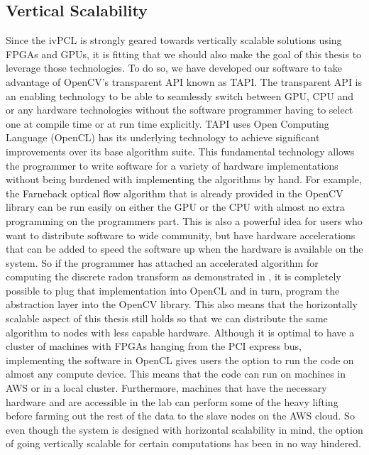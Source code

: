 \subsection{\label{subsection:opencv_tapi}Vertical Scalability}
Since the ivPCL is strongly geared towards vertically scalable solutions using
FPGAs and GPUs, it is fitting that we should also make the goal of this thesis
to leverage those technologies. To do so, we have developed our software to take
advantage of OpenCV's transparent API known as TAPI. The transparent API is an
enabling technology to be able to seamlessly switch between GPU, CPU and or any
hardware technologies without the software programmer having to select one at
compile time or at run time explicitly. TAPI uses Open Computing Language
(OpenCL) has its underlying technology to achieve significant improvements over
its base algorithm suite. This fundamental technology allows the programmer to
write software for a variety of hardware implementations without being burdened
with implementing the algorithms by hand. For example, the Farneback optical
flow algorithm that is already provided in the OpenCV library can be run easily
on either the GPU or the CPU with almost no extra programming on the programmers
part. This is also a powerful idea for users who want to distribute software to
wide community, but have hardware accelerations that can be added to speed the
software up when the hardware is available on the system. So if the programmer
has attached an accelerated algorithm for computing the discrete radon transform
as demonstrated in \cite{Cesar2014a}, it is completely possible to plug that
implementation into OpenCL and in turn, program the abstraction layer into the
OpenCV library. This also means that the horizontally scalable aspect of this
thesis still holds so that we can distribute the same algorithm to nodes with
less capable hardware. Although it is optimal to have a cluster of machines with
FPGAs hanging from the PCI express bus, implementing the software in OpenCL
gives users the option to run the code on almost any compute device. This means
that the code can run on machines in AWS or in a local cluster. Furthermore,
machines that have the necessary hardware and are accessible in the lab can
perform some of the heavy lifting before farming out the rest of the data to the
slave nodes on the AWS cloud. So even though the system is designed with
horizontal scalability in mind, the option of going vertically scalable for
certain computations has been in no way hindered.

